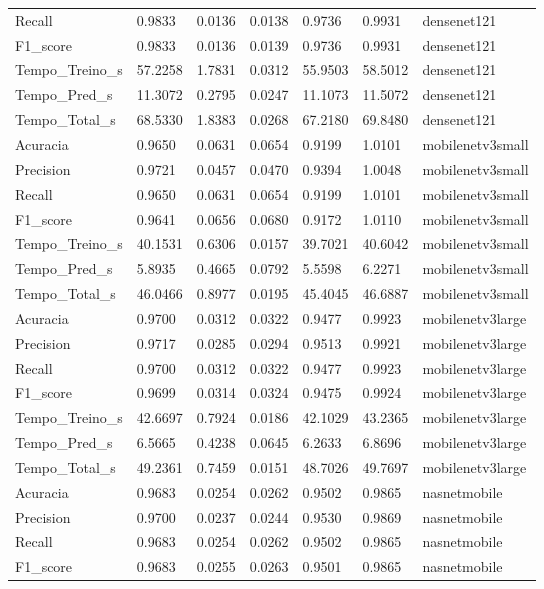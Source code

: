 \begin{tabular}{lllllll}
Recall & 0.9833 & 0.0136 & 0.0138 & 0.9736 & 0.9931 & densenet121 \\
F1_score & 0.9833 & 0.0136 & 0.0139 & 0.9736 & 0.9931 & densenet121 \\
Tempo_Treino_s & 57.2258 & 1.7831 & 0.0312 & 55.9503 & 58.5012 & densenet121 \\
Tempo_Pred_s & 11.3072 & 0.2795 & 0.0247 & 11.1073 & 11.5072 & densenet121 \\
Tempo_Total_s & 68.5330 & 1.8383 & 0.0268 & 67.2180 & 69.8480 & densenet121 \\
Acuracia & 0.9650 & 0.0631 & 0.0654 & 0.9199 & 1.0101 & mobilenetv3small \\
Precision & 0.9721 & 0.0457 & 0.0470 & 0.9394 & 1.0048 & mobilenetv3small \\
Recall & 0.9650 & 0.0631 & 0.0654 & 0.9199 & 1.0101 & mobilenetv3small \\
F1_score & 0.9641 & 0.0656 & 0.0680 & 0.9172 & 1.0110 & mobilenetv3small \\
Tempo_Treino_s & 40.1531 & 0.6306 & 0.0157 & 39.7021 & 40.6042 & mobilenetv3small \\
Tempo_Pred_s & 5.8935 & 0.4665 & 0.0792 & 5.5598 & 6.2271 & mobilenetv3small \\
Tempo_Total_s & 46.0466 & 0.8977 & 0.0195 & 45.4045 & 46.6887 & mobilenetv3small \\
Acuracia & 0.9700 & 0.0312 & 0.0322 & 0.9477 & 0.9923 & mobilenetv3large \\
Precision & 0.9717 & 0.0285 & 0.0294 & 0.9513 & 0.9921 & mobilenetv3large \\
Recall & 0.9700 & 0.0312 & 0.0322 & 0.9477 & 0.9923 & mobilenetv3large \\
F1_score & 0.9699 & 0.0314 & 0.0324 & 0.9475 & 0.9924 & mobilenetv3large \\
Tempo_Treino_s & 42.6697 & 0.7924 & 0.0186 & 42.1029 & 43.2365 & mobilenetv3large \\
Tempo_Pred_s & 6.5665 & 0.4238 & 0.0645 & 6.2633 & 6.8696 & mobilenetv3large \\
Tempo_Total_s & 49.2361 & 0.7459 & 0.0151 & 48.7026 & 49.7697 & mobilenetv3large \\
Acuracia & 0.9683 & 0.0254 & 0.0262 & 0.9502 & 0.9865 & nasnetmobile \\
Precision & 0.9700 & 0.0237 & 0.0244 & 0.9530 & 0.9869 & nasnetmobile \\
Recall & 0.9683 & 0.0254 & 0.0262 & 0.9502 & 0.9865 & nasnetmobile \\
F1_score & 0.9683 & 0.0255 & 0.0263 & 0.9501 & 0.9865 & nasnetmobile \\

\end{tabular}
